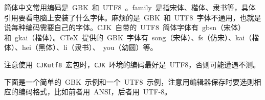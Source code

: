 简体中文常用编码是~GBK~和~UTF8~。family~是指宋体、楷体、隶书等，具体引用要看电脑上安装了什么字体。麻烦的是~GBK~和~UTF8~字体不通用，也就是说每种编码需要自己的字体。CJK~自带的~UTF8~简体字体有~gbsn（宋体）和~gkai（楷体）。CTeX~提供的~GBK~字体有~song（宋体）、fs（仿宋）、kai（楷体）、hei（黑体）、li（隶书）、~you（幼圆）等。

注意使用~\verb|CJKutf8|~宏包时，\verb|CJK|~环境的编码最好是~UTF8，否则可能遭遇不测。

下面是一个简单的~GBK~示例和一个~UTF8~示例，注意用编辑器保存时要选则相应的编码格式，比如前者用~ANSI，后者用~UTF-8。




\newpage
